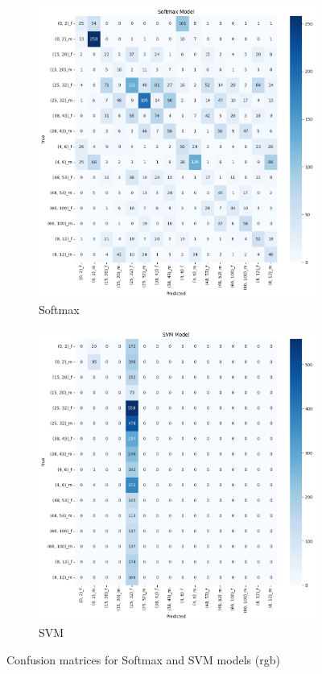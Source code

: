 \documentclass{article}
\begin{document}
\begin{figure}[H]
    \centering
    \begin{subfigure}[b]{0.48\textwidth}
        \includegraphics[width=\textwidth]{assets/confusion_matrix/rgb/Softmax Model.png}
        \caption{Softmax}
    \end{subfigure}
    \hfill
    \begin{subfigure}[b]{0.48\textwidth}
        \includegraphics[width=\textwidth]{assets/confusion_matrix/rgb/SVM Model.png}
        \caption{SVM}
    \end{subfigure}
    \caption{Confusion matrices for Softmax and SVM models (rgb)}
    \label{fig:rgb_confusion_matrices_1}
\end{figure}
\end{document}
